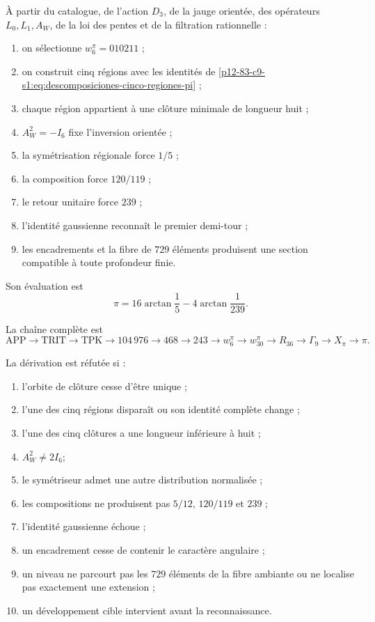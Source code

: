 \begin{theorem}
\label{p12-83-c9-s1:thm:caracterizacion-final-pi-autonoma}
À partir du catalogue, de l’action \(D_3\), de la jauge orientée, des
opérateurs \(L_0,L_1,A_W\), de la loi des pentes et de la filtration rationnelle :
\begin{enumerate}
 \item on sélectionne \(w_6^\pi=010211\) ;
 \item on construit cinq régions avec les identités de
       \eqref{p12-83-c9-s1:eq:descomposiciones-cinco-regiones-pi} ;
 \item chaque région appartient à une clôture minimale de longueur huit ;
 \item \(A_W^2=-I_6\) fixe l’inversion orientée ;
 \item la symétrisation régionale force \(1/5\) ;
 \item la composition force \(120/119\) ;
 \item le retour unitaire force \(239\) ;
 \item l’identité gaussienne reconnaît le premier demi-tour ;
 \item les encadrements et la fibre de \(729\) éléments produisent une section
       compatible à toute profondeur finie.
\end{enumerate}
Son évaluation est
\[
 \boxed{\pi=16\arctan\frac15-4\arctan\frac1{239}.}
\]
\end{theorem}

La chaîne complète est
\[
 \mathrm{APP}\to\mathrm{TRIT}\to\mathrm{TPK}
 \to104\,976\to468\to243\to w_6^\pi
 \to w_{30}^\pi\to R_{36}\to\Gamma_9
 \to X_\pi\to\pi.
\]

\begin{criterion}
La dérivation est réfutée si :
\begin{enumerate}
 \item l’orbite de clôture cesse d’être unique ;
 \item l’une des cinq régions disparaît ou son identité complète change ;
 \item l’une des cinq clôtures a une longueur inférieure à huit ;
 \item \(A_W^2\ne2I_6\);
 \item le symétriseur admet une autre distribution normalisée ;
 \item les compositions ne produisent pas \(5/12\), \(120/119\) et \(239\) ;
 \item l’identité gaussienne échoue ;
 \item un encadrement cesse de contenir le caractère angulaire ;
 \item un niveau ne parcourt pas les \(729\) éléments de la fibre ambiante ou ne
       localise pas exactement une extension ;
 \item un développement cible intervient avant la reconnaissance.
\end{enumerate}
\end{criterion}
\fi

